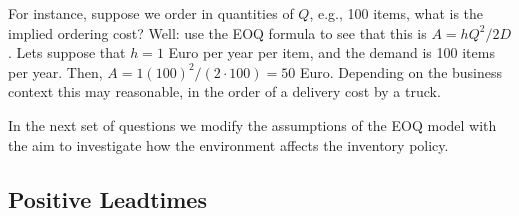 \begin{exercise}
For instance,
      suppose we order in quantities of $Q$, e.g., 100 items, what is
      the implied ordering cost?  Well: use the EOQ formula to see
      that this is $A=hQ^2/2D$.  Lets suppose that $h=1$ Euro per year
      per item, and the demand is 100 items per year. Then,
      $A=1(100)^2/(2\cdot 100) = 50$ Euro. Depending on the business
      context this may reasonable, in the order of a delivery cost by
      a truck.
\end{exercise}


In the next set of questions we modify the assumptions of the EOQ model with the aim to investigate how the environment affects the inventory policy.



\subsection{Positive Leadtimes}
\label{sec:variations}


